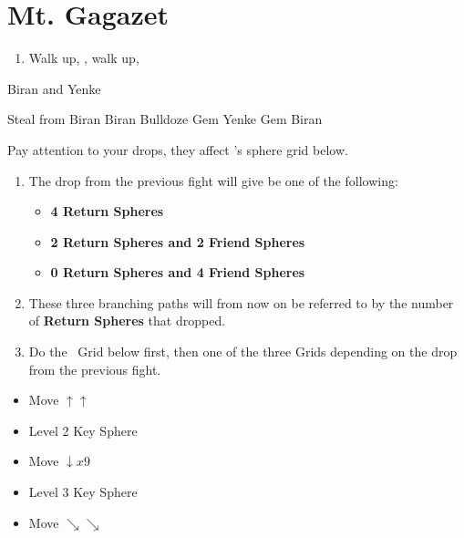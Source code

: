 \chapter{Mt. Gagazet}
\begin{enumerate}
    \item Walk up, \cs[3:40], walk up, \sd
\end{enumerate}
\begin{battle}{Biran and Yenke}
    \begin{itemize}
        \kimahrif Steal from Biran
        \enemyf Biran Bulldoze
        \kimahrif Gem Yenke
        \kimahrif Gem Biran
    \end{itemize}
    Pay attention to your drops, they affect \yuna's sphere grid below.
\end{battle}
\begin{enumerate}[resume]
    \item The drop from the previous fight will give be one of the following:
    \begin{itemize}
        \item \textbf{4 Return Spheres}
        \item \textbf{2 Return Spheres and 2 Friend Spheres}
        \item \textbf{0 Return Spheres and 4 Friend Spheres}
    \end{itemize}
    \item These three branching paths will from now on be referred to by the number of \textbf{Return Spheres} that dropped.
    \item Do the \lulu\ Grid below first, then one of the three Grids depending on the drop from the previous fight.
\end{enumerate}
\begin{spheregrid}[Lulu]
    \begin{itemize}
        \luluf
        \begin{itemize}
            \item Move $\uparrow\uparrow$
            \item Level 2 Key Sphere
            \item Move $\downarrow x9$
            \item Level 3 Key Sphere
            \item Move $\searrow\searrow$
        \end{itemize}
    \end{itemize}
\end{spheregrid}
